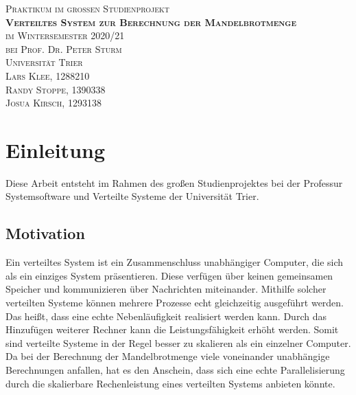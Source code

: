 \documentclass[12pt, onecolumn, notitlepage]{scrartcl}
\begin{document}
\renewcommand{\figurename}{Abb.} 


\thispagestyle{empty}
\vspace*{7cm}
\begin{center}
	\Large{
		\textsc{
			Praktikum im großen Studienprojekt \\ [1em]
			\textbf{Verteiltes System zur Berechnung der Mandelbrotmenge} \\ [1em]
			im Wintersemester 2020/21 \\
			bei Prof. Dr. Peter Sturm \\ [1em]
			Universität Trier \\ [1em]
			Lars Klee, 1288210 \\
			Randy Stoppe, 1390338 \\
			Josua Kirsch, 1293138
		}
	}
\end{center}
\setcounter{page}{0}
\newpage

\newpage
	\tableofcontents
\newpage
{}


\section{Einleitung}
Diese Arbeit entsteht im Rahmen des großen Studienprojektes bei der Professur Systemsoftware und Verteilte Systeme der Universität Trier.
\subsection{Motivation}
Ein verteiltes System ist ein Zusammenschluss unabhängiger Computer, die sich als ein einziges System präsentieren. Diese verfügen über keinen gemeinsamen Speicher und kommunizieren über Nachrichten miteinander. Mithilfe solcher verteilten Systeme können mehrere Prozesse echt gleichzeitig ausgeführt werden. Das heißt, dass eine echte Nebenläufigkeit realisiert werden kann. Durch das Hinzufügen weiterer Rechner kann die Leistungsfähigkeit erhöht werden. Somit sind verteilte Systeme in der Regel besser zu skalieren als ein einzelner Computer. Da bei der Berechnung der Mandelbrotmenge viele voneinander unabhängige Berechnungen anfallen, hat es den Anschein, dass sich eine echte Parallelisierung durch die skalierbare Rechenleistung eines verteilten Systems anbieten könnte. 
\end{document}
